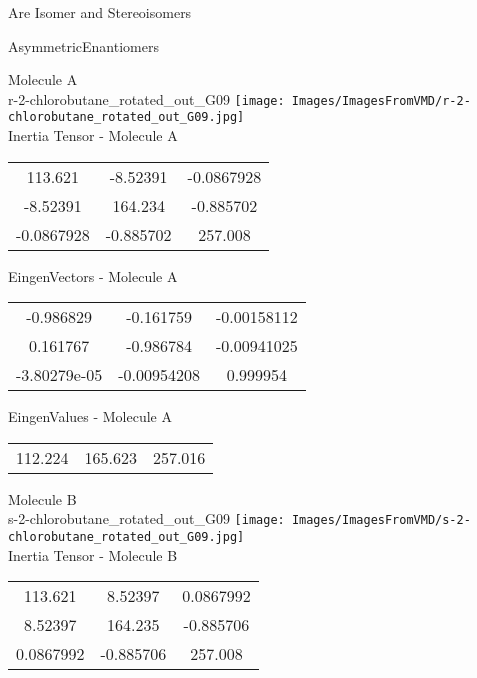 \begin{center}
\vtab
\vtab
\textcolor{NavyBlue}{\Large Are Isomer and Stereoisomers}
\end{center}
\newpage

\vtab[-2cm]
\begin{center}
{\large AsymmetricEnantiomers}
\end{center}
\begin{multicols}{2}
\begin{center}
Molecule A \\ 
r-2-chlorobutane\_rotated\_out\_G09
\texttt{[image: Images/ImagesFromVMD/r-2-chlorobutane\_rotated\_out\_G09.jpg]}
\\
Inertia Tensor - Molecule A \\
\vtab
\begin{tabular}{|c c c|}
113.621	 & 	-8.52391	 & 	-0.0867928	 \\
-8.52391	 & 	164.234	 & 	-0.885702	 \\
-0.0867928	 & 	-0.885702	 & 	257.008
\end{tabular}

\vtab
 EingenVectors - Molecule A     \\
\vtab
\begin{tabular}{|c c c|}
-0.986829	 & 	-0.161759	 & 	-0.00158112	 \\
0.161767	 & 	-0.986784	 & 	-0.00941025	 \\
-3.80279e-05	 & 	-0.00954208	 & 	0.999954
\end{tabular}

\vtab
 EingenValues - Molecule A     \\
\vtab
\begin{tabular}{|c c c|}
112.224	 & 	165.623	 & 	257.016
\end{tabular}
\columnbreak

Molecule B \\ 
s-2-chlorobutane\_rotated\_out\_G09
\texttt{[image: Images/ImagesFromVMD/s-2-chlorobutane\_rotated\_out\_G09.jpg]}
\\
Inertia Tensor - Molecule B \\
\vtab
\begin{tabular}{|c c c|}
113.621	 & 	8.52397	 & 	0.0867992	 \\
8.52397	 & 	164.235	 & 	-0.885706	 \\
0.0867992	 & 	-0.885706	 & 	257.008
\end{tabular}


\end{center}
\end{multicols}
